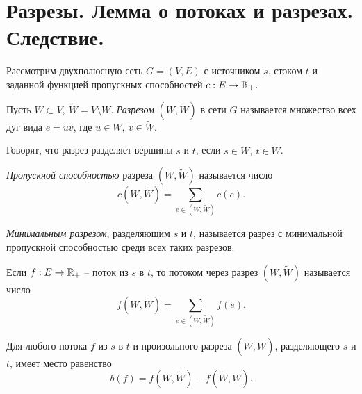 \section{Разрезы. Лемма о потоках и разрезах. Следствие.}

\begin{note}
    Рассмотрим двухполюсную сеть $ G = (V,E) $ с источником $ s $, стоком $ t $ и заданной функцией пропускных способностей $ c: E \rightarrow \mathbb{R}_+ $.
\end{note}

\begin{definition}[Разрез]
    Пусть $ W \subset V, \ \widetilde{W} = V \setminus W $. \emph{Разрезом} $ (W, \widetilde{W}) $ в сети $ G $ называется множество всех дуг вида $ e = uv $, где $ u \in W, \ v \in \widetilde{W} $.
\end{definition}

\begin{note}
    Говорят, что разрез разделяет вершины $ s $ и $ t $, если $ s \in W, \ t \in \widetilde{W} $.
\end{note}

\begin{definition}
    \emph{Пропускной способностью} разреза $ (W, \widetilde{W}) $ называется число
    \[
        c(W,\widetilde{W})= \sum_{e \in (W,\widetilde{W})}c(e).
    \]
\end{definition}

\begin{definition}
    \emph{Минимальным разрезом}, разделяющим $ s $ и $ t $, называется разрез с минимальной пропускной способностью среди всех таких разрезов.
\end{definition}

\begin{definition}
    Если $ f: E \rightarrow \mathbb{R}_+ $ -- поток из $ s $ в $ t $, то потоком через разрез $ (W,\widetilde{W}) $ называется число
    \[
        f(W,\widetilde{W}) = \sum_{e\in(W,\widetilde{W})}f(e).
    \]
\end{definition}

\begin{lemma}
    Для любого потока $ f $ из $ s $ в $ t $ и произольного разреза $ (W,\widetilde{W}) $, разделяющего $ s $ и $ t $, имеет место равенство
    \[
        b(f) = f(W,\widetilde{W}) - f(\widetilde{W},W).
    \]
\end{lemma}

